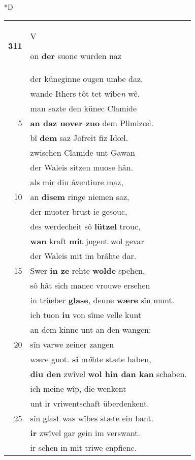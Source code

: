 \documentclass[8pt,a4paper,notitlepage]{article}
\begin{document}
\begin{table}[ht]
\begin{minipage}[t]{0.5\linewidth}
\small
\begin{center}*D
\end{center}
\begin{tabular}{rl}
\textbf{311} & \begin{large}V\end{large}on \textbf{der} suone wurden naz\\ 
 & der küneginne ougen umbe daz,\\ 
 & wande Ithers tôt tet wîbe\textit{n} wê.\\ 
 & man sazte den künec Clamide\\ 
5 & \textbf{an daz uover zuo} dem Plimizœl.\\ 
 & bî \textbf{dem} saz Jofreit fiz Idœl.\\ 
 & zwischen Clamide unt Gawan\\ 
 & der Waleis sitzen muose hân.\\ 
 & als mir diu âventiure maz,\\ 
10 & an \textbf{disem} ringe niemen saz,\\ 
 & der muoter brust ie gesouc,\\ 
 & des werdecheit sô \textbf{lützel} trouc,\\ 
 & \textbf{wan} kraft \textbf{mit} jugent wol gevar\\ 
 & der Waleis mit im brâhte dar.\\ 
15 & Swer \textbf{in ze} rehte \textbf{wolde} spehen,\\ 
 & sô hât sich manec vrouwe ersehen\\ 
 & in trüeber \textbf{glase}, denne \textbf{wære} sîn munt.\\ 
 & ich tuon \textbf{iu} von sîme velle kunt\\ 
 & an dem kinne unt an den wangen:\\ 
20 & sîn varwe zeiner zangen\\ 
 & wære guot. \textbf{si} m\textit{ö}hte stæte haben,\\ 
 & \textbf{diu den} zwîvel \textbf{wol hin dan kan} schaben.\\ 
 & ich meine wîp, die wenkent\\ 
 & unt ir vriwentschaft überdenkent.\\ 
25 & sîn glast was wîbes stæte ein bant.\\ 
 & \textbf{ir} zwîvel gar gein im verswant.\\ 
 & ir sehen in mit triwe enpfienc.\\ 

\end{tabular}
\end{minipage}
\end{table}
\end{document}
